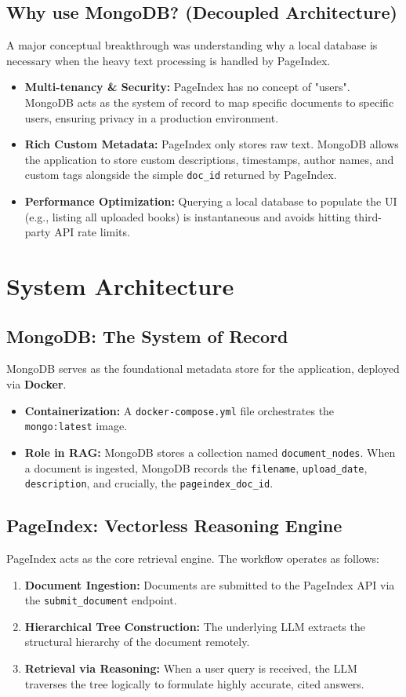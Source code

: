 \documentclass[12pt,a4paper]{article}
\begin{document}
\subsection{Why use MongoDB? (Decoupled Architecture)}
A major conceptual breakthrough was understanding why a local database is necessary when the heavy text processing is handled by PageIndex. 
\begin{itemize}
    \item \textbf{Multi-tenancy \& Security:} PageIndex has no concept of "users". MongoDB acts as the system of record to map specific documents to specific users, ensuring privacy in a production environment.
    \item \textbf{Rich Custom Metadata:} PageIndex only stores raw text. MongoDB allows the application to store custom descriptions, timestamps, author names, and custom tags alongside the simple \texttt{doc\_id} returned by PageIndex.
    \item \textbf{Performance Optimization:} Querying a local database to populate the UI (e.g., listing all uploaded books) is instantaneous and avoids hitting third-party API rate limits.
\end{itemize}

\section{System Architecture}

\subsection{MongoDB: The System of Record}
MongoDB serves as the foundational metadata store for the application, deployed via \textbf{Docker}.
\begin{itemize}
    \item \textbf{Containerization:} A \texttt{docker-compose.yml} file orchestrates the \texttt{mongo:latest} image.
    \item \textbf{Role in RAG:} MongoDB stores a collection named \texttt{document\_nodes}. When a document is ingested, MongoDB records the \texttt{filename}, \texttt{upload\_date}, \texttt{description}, and crucially, the \texttt{pageindex\_doc\_id}.
\end{itemize}

\subsection{PageIndex: Vectorless Reasoning Engine}
PageIndex acts as the core retrieval engine. The workflow operates as follows:
\begin{enumerate}
    \item \textbf{Document Ingestion:} Documents are submitted to the PageIndex API via the \texttt{submit\_document} endpoint.
    \item \textbf{Hierarchical Tree Construction:} The underlying LLM extracts the structural hierarchy of the document remotely.
    \item \textbf{Retrieval via Reasoning:} When a user query is received, the LLM traverses the tree logically to formulate highly accurate, cited answers.
\end{enumerate}
\end{document}
